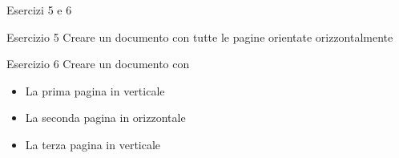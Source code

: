 \begin{frame}{Esercizi 5 e 6}

\begin{block}{Esercizio 5}
Creare un documento con tutte le pagine orientate orizzontalmente
\end{block}

\vfill

\begin{block}{Esercizio 6}
Creare un documento con 
\begin{itemize}
	\item La prima pagina in verticale
	\item La seconda pagina in orizzontale
	\item La terza pagina in verticale
\end{itemize}
\end{block}

\end{frame}
